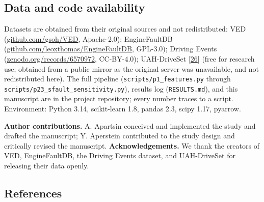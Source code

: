 \subsection{Data and code availability}\label{repro}

Datasets are obtained from their original sources and not redistributed:
VED (\href{https://github.com/gsoh/VED}{github.com/gsoh/VED},
Apache-2.0); EngineFaultDB
(\href{https://github.com/leoxthomas/EngineFaultDB}{github.com/leoxthomas/EngineFaultDB},
GPL-3.0); Driving Events
(\href{https://zenodo.org/records/6570972}{zenodo.org/records/6570972},
CC-BY-4.0); UAH-DriveSet {[}\hyperref[r26]{26}{]} (free for research
use; obtained from a public mirror as the original server was
unavailable, and not redistributed here). The full pipeline
(\texttt{scripts/p1\_features.py} through
\texttt{scripts/p23\_sfault\_sensitivity.py}), results log
(\texttt{RESULTS.md}), and this manuscript are in the project
repository; every number traces to a script. Environment: Python 3.14,
scikit-learn 1.8, pandas 2.3, scipy 1.17, pyarrow.

\textbf{Author contributions.} A. Apartsin conceived and implemented the
study and drafted the manuscript; Y. Aperstein contributed to the study
design and critically revised the manuscript. \textbf{Acknowledgements.}
We thank the creators of VED, EngineFaultDB, the Driving Events dataset,
and UAH-DriveSet for releasing their data openly.

\subsection{References}\label{refs}

